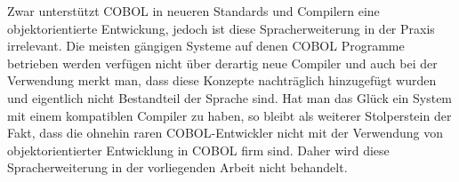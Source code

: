 Zwar unterstützt COBOL in neueren Standards und Compilern eine objektorientierte Entwickung, jedoch ist diese Spracherweiterung in der Praxis irrelevant. Die meisten gängigen Systeme auf denen COBOL Programme betrieben werden verfügen nicht über derartig neue Compiler und auch bei der Verwendung merkt man, dass diese Konzepte nachträglich hinzugefügt wurden und eigentlich nicht Bestandteil der Sprache sind. Hat man das Glück ein System mit einem kompatiblen Compiler zu haben, so bleibt als weiterer Stolperstein der Fakt, dass die ohnehin raren COBOL-Entwickler nicht mit der Verwendung von objektorientierter Entwicklung in COBOL firm sind. Daher wird diese Spracherweiterung in der vorliegenden Arbeit nicht behandelt. 